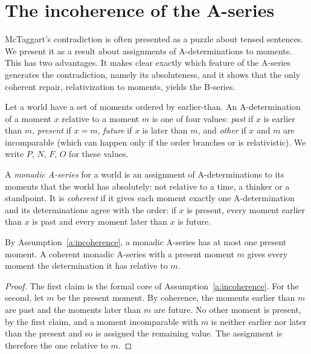\documentclass{situationist-preprint}
\begin{document}
\section{The incoherence of the A-series}\label{s:incoherence}

McTaggart's contradiction is often presented as a puzzle about tensed sentences. We present it as a result about assignments of A-determinations to moments. This has two advantages. It makes clear exactly which feature of the A-series generates the contradiction, namely its absoluteness, and it shows that the only coherent repair, relativization to moments, yields the B-series.

Let a world have a set of moments ordered by earlier-than. An A-determination of a moment $x$ relative to a moment $m$ is one of four values: \emph{past} if $x$ is earlier than $m$, \emph{present} if $x = m$, \emph{future} if $x$ is later than $m$, and \emph{other} if $x$ and $m$ are incomparable (which can happen only if the order branches or is relativistic). We write $P$, $N$, $F$, $O$ for these values.

\begin{definition}\label{d:monadic}
A \emph{monadic A-series} for a world is an assignment of A-determinations to its moments that the world has absolutely: not relative to a time, a thinker or a standpoint. It is \emph{coherent} if it gives each moment exactly one A-determination and its determinations agree with the order: if $x$ is present, every moment earlier than $x$ is past and every moment later than $x$ is future.
\end{definition}

\begin{lemma}\label{l:onepresent}
By Assumption~\ref{a:incoherence}, a monadic A-series has at most one present moment. A coherent monadic A-series with a present moment $m$ gives every moment the determination it has relative to $m$.
\end{lemma}

\begin{proof}
The first claim is the formal core of Assumption~\ref{a:incoherence}. For the second, let $m$ be the present moment. By coherence, the moments earlier than $m$ are past and the moments later than $m$ are future. No other moment is present, by the first claim, and a moment incomparable with $m$ is neither earlier nor later than the present and so is assigned the remaining value. The assignment is therefore the one relative to $m$.
\end{proof}
\end{document}
